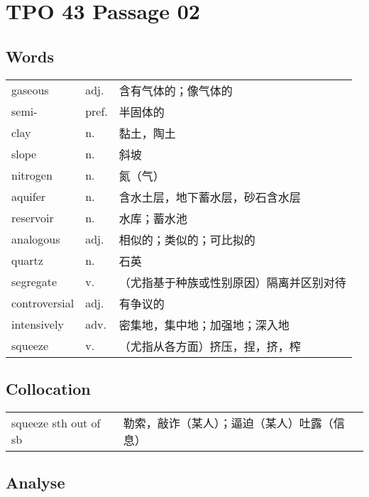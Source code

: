 \section{TPO 43 Passage 02}

\subsection{Words}

\begin{tabular}{lll}
    gaseous       & adj.  & 含有气体的；像气体的           \\
    semi-         & pref. & 半固体的                 \\
    clay          & n.    & 黏土，陶土                \\
    slope         & n.    & 斜坡                   \\
    nitrogen      & n.    & 氮（气）                 \\
    aquifer       & n.    & 含水土层，地下蓄水层，砂石含水层     \\
    reservoir     & n.    & 水库；蓄水池               \\
    analogous     & adj.  & 相似的；类似的；可比拟的         \\
    quartz        & n.    & 石英                   \\
    segregate     & v.    & （尤指基于种族或性别原因）隔离并区别对待 \\
    controversial & adj.  & 有争议的                 \\
    intensively   & adv.  & 密集地，集中地；加强地；深入地      \\
    squeeze       & v.    & （尤指从各方面）挤压，捏，挤，榨     \\
\end{tabular}

\subsection{Collocation}

\begin{tabular}{ll}
    squeeze sth out of sb & 勒索，敲诈（某人）；逼迫（某人）吐露（信息） \\
\end{tabular}

\newpage

\subsection{Analyse}

